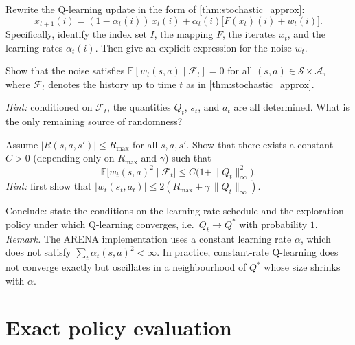 \documentclass[11pt]{article}
\newcommand{\cS}{\mathcal{S}}
\newcommand{\cA}{\mathcal{A}}
\begin{document}
\begin{exercise}
\label{prob:identify_SA} Rewrite the Q-learning update in the form of \cref{thm:stochastic_approx}:
$$
x_{t+1}(i) = (1 - \alpha_t(i))\, x_t(i) + \alpha_t(i)\bigl[F(x_t)(i) + w_t(i)\bigr].
$$
Specifically, identify the index set $I$, the mapping $F$, the iterates $x_t$, and the learning rates $\alpha_t(i)$. Then give an explicit expression for the noise $w_t$.
\end{exercise}


\begin{exercise}
\label{prob:noise_zero_mean} Show that the noise satisfies $\mathbb{E}[w_t(s,a) \mid \mathcal{F}_t] = 0$ for all $(s,a) \in \cS \times \cA$, where $\mathcal{F}_t$ denotes the history up to time $t$ as in \cref{thm:stochastic_approx}.

\textit{Hint:} conditioned on $\mathcal{F}_t$, the quantities $Q_t$, $s_t$, and $a_t$ are all determined. What is the only remaining source of randomness?
\end{exercise}


\begin{exercise}
\label{prob:noise_bounded_var} Assume $|R(s,a,s')| \le R_{\max}$ for all $s, a, s'$. Show that there exists a constant $C > 0$ (depending only on $R_{\max}$ and $\gamma$) such that
$$
\mathbb{E}\bigl[w_t(s,a)^2 \mid \mathcal{F}_t\bigr] \le C\bigl(1 + \|Q_t\|_\infty^2\bigr).
$$
\textit{Hint:} first show that $|w_t(s_t, a_t)| \le 2(R_{\max} + \gamma\, \|Q_t\|_\infty)$.
\end{exercise}


\begin{exercise}
\label{prob:q_learning_converge} Conclude: state the conditions on the learning rate schedule and the exploration policy under which Q-learning converges, i.e.\ $Q_t \to Q^*$ with probability $1$.
\emph{Remark.} The ARENA implementation uses a constant learning rate $\alpha$, which does not satisfy $\sum_t \alpha_t(s,a)^2 < \infty$. In practice, constant-rate Q-learning does not converge exactly but oscillates in a neighbourhood of $Q^*$ whose size shrinks with $\alpha$.
\end{exercise}




\section{Exact policy evaluation}\label{prob:exact_eval}
\end{document}
